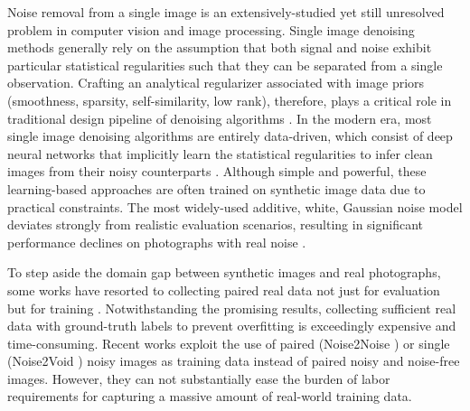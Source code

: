 \documentclass[10pt,twocolumn,letterpaper]{article}
\begin{document}
Noise removal from a single image is an extensively-studied yet still unresolved problem in
computer vision and image processing. Single image denoising methods generally
rely on the assumption that both signal and noise exhibit particular statistical
regularities such that they can be separated from a single observation. Crafting
an analytical regularizer associated with image priors (\eg smoothness,
sparsity, self-similarity, low rank), therefore, plays a critical role in
traditional design pipeline of denoising algorithms \cite{Rudin1992Nonlinear,osher2005iterative,elad2006image,dong2011sparsity,mairal2008sparse,dabov2007BM3D,Buades2005A,Gu2014Weighted}.
In the modern era, most single image denoising algorithms are entirely
data-driven, which consist of deep neural networks that implicitly learn the
statistical regularities to infer clean images from their noisy counterparts
\cite{Schmidt_2014_CVPR,Chen_2015_CVPR,mao2016image,zhang2017beyond,Gharbi:2016:DJD:2980179.2982399,tai2017memnet,Chen_2018_ECCV,Shi2018Toward}. Although simple and powerful, these
learning-based approaches are often trained on
synthetic image data due to practical constraints. The most widely-used additive, white, Gaussian noise model
deviates strongly from realistic evaluation scenarios, resulting in significant
performance declines on photographs with real noise \cite{Plotz_2017_CVPR,Abdelhamed_2018_CVPR}.
 
To step aside the domain gap between synthetic images and real photographs, some
works have resorted to collecting paired real data not just for evaluation but
for training \cite{Abdelhamed_2018_CVPR,Chen_2018_CVPR,Schwartz2018DeepISP,Chen_2019_ICCV,Jiang_2019_ICCV}.
Notwithstanding the promising results, collecting sufficient real data with ground-truth labels to prevent overfitting is exceedingly expensive and
time-consuming. Recent works exploit the use of paired (Noise2Noise
\cite{pmlr-v80-lehtinen18a}) or single (Noise2Void
\cite{Krull_2019_CVPR}) noisy images as training data instead
of paired noisy and noise-free images. However, they can not substantially ease the
burden of labor requirements for capturing a massive amount of real-world
training data.
\end{document}
